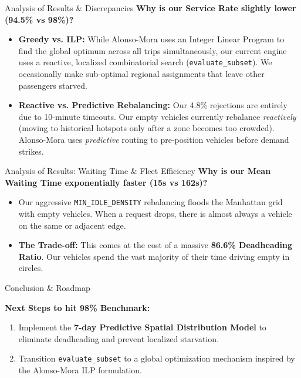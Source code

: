 \documentclass{beamer}
\begin{document}
\begin{frame}{Analysis of Results \& Discrepancies}
  \textbf{Why is our Service Rate slightly lower (94.5\% vs 98\%)?}
  \begin{itemize}
      \item \textbf{Greedy vs. ILP:} While Alonso-Mora uses an Integer Linear Program to find the global optimum across all trips simultaneously, our current engine uses a reactive, localized combinatorial search (\texttt{evaluate\_subset}). We occasionally make sub-optimal regional assignments that leave other passengers starved.
      \item \textbf{Reactive vs. Predictive Rebalancing:} Our 4.8\% rejections are entirely due to 10-minute timeouts. Our empty vehicles currently rebalance \textit{reactively} (moving to historical hotspots only after a zone becomes too crowded). Alonso-Mora uses \textit{predictive} routing to pre-position vehicles before demand strikes.
  \end{itemize}
\end{frame}

\begin{frame}{Analysis of Results: Waiting Time \& Fleet Efficiency}
  \textbf{Why is our Mean Waiting Time exponentially faster (15s vs 162s)?}
  \begin{itemize}
      \item Our aggressive \texttt{MIN\_IDLE\_DENSITY} rebalancing floods the Manhattan grid with empty vehicles. When a request drops, there is almost always a vehicle on the same or adjacent edge.
      \item \textbf{The Trade-off:} This comes at the cost of a massive \textbf{86.6\% Deadheading Ratio}. Our vehicles spend the vast majority of their time driving empty in circles.
  \end{itemize}
\end{frame}

\begin{frame}{Conclusion \& Roadmap}
  \begin{center}
  \end{center}
  \vspace{0.5cm}
  \textbf{Next Steps to hit 98\% Benchmark:}
  \begin{enumerate}
      \item Implement the \textbf{7-day Predictive Spatial Distribution Model} to eliminate deadheading and prevent localized starvation.
      \item Transition \texttt{evaluate\_subset} to a global optimization mechanism inspired by the Alonso-Mora ILP formulation.
  \end{enumerate}
\end{frame}
\end{document}
